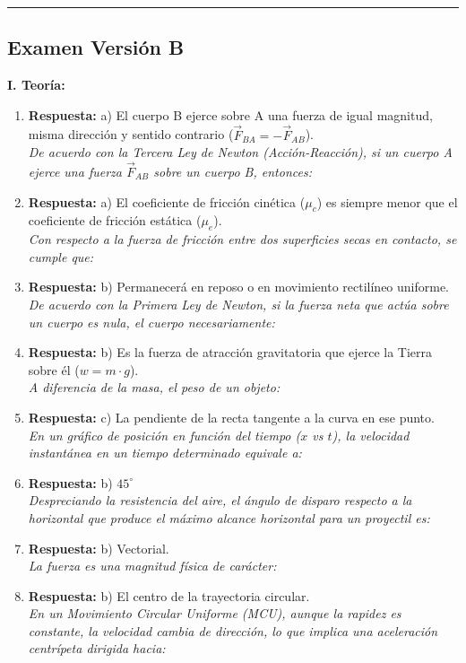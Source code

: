 \documentclass[11pt,a4paper]{article}
\begin{document}
\begin{enumerate}
\end{enumerate}\vspace{0.4cm} \hrule \vspace{0.4cm}\subsection*{Examen Versión B}\textbf{I. Teoría:}\begin{enumerate}    \item \textbf{Respuesta:} a) El cuerpo B ejerce sobre A una fuerza de igual magnitud, misma dirección y sentido contrario ($\vec{F}_{BA} = -\vec{F}_{AB}$). \\ \textit{De acuerdo con la Tercera Ley de Newton (Acción-Reacción), si un cuerpo A ejerce una fuerza $\vec{F}_{AB}$ sobre un cuerpo B, entonces:}
    \item \textbf{Respuesta:} a) El coeficiente de fricción cinética ($\mu_c$) es siempre menor que el coeficiente de fricción estática ($\mu_e$). \\ \textit{Con respecto a la fuerza de fricción entre dos superficies secas en contacto, se cumple que:}
    \item \textbf{Respuesta:} b) Permanecerá en reposo o en movimiento rectilíneo uniforme. \\ \textit{De acuerdo con la Primera Ley de Newton, si la fuerza neta que actúa sobre un cuerpo es nula, el cuerpo necesariamente:}
    \item \textbf{Respuesta:} b) Es la fuerza de atracción gravitatoria que ejerce la Tierra sobre él ($w = m \cdot g$). \\ \textit{A diferencia de la masa, el peso de un objeto:}
    \item \textbf{Respuesta:} c) La pendiente de la recta tangente a la curva en ese punto. \\ \textit{En un gráfico de posición en función del tiempo ($x$ vs $t$), la velocidad instantánea en un tiempo determinado equivale a:}
    \item \textbf{Respuesta:} b) $45^\circ$ \\ \textit{Despreciando la resistencia del aire, el ángulo de disparo respecto a la horizontal que produce el máximo alcance horizontal para un proyectil es:}
    \item \textbf{Respuesta:} b) Vectorial. \\ \textit{La fuerza es una magnitud física de carácter:}
    \item \textbf{Respuesta:} b) El centro de la trayectoria circular. \\ \textit{En un Movimiento Circular Uniforme (MCU), aunque la rapidez es constante, la velocidad cambia de dirección, lo que implica una aceleración centrípeta dirigida hacia:}

\end{enumerate}
\end{document}
